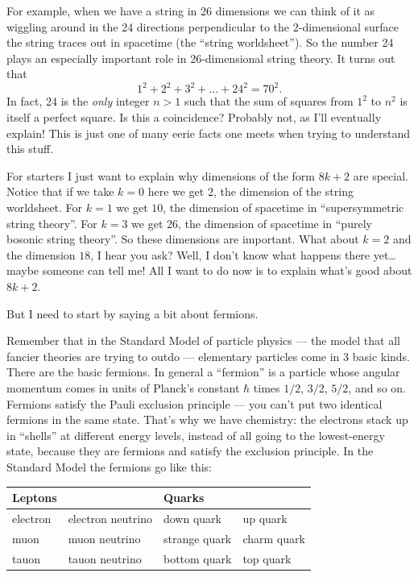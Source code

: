 \documentclass{article}
\begin{document}
For example, when we have a string in 26 dimensions we can think of it
as wiggling around in the 24 directions perpendicular to the
2-dimensional surface the string traces out in spacetime (the ``string
worldsheet''). So the number 24 plays an especially important role in
26-dimensional string theory. It turns out that
\[1^2 + 2^2 + 3^2 + \ldots + 24^2 = 70^2.\] In fact, 24 is the
\emph{only} integer \(n > 1\) such that the sum of squares from \(1^2\)
to \(n^2\) is itself a perfect square. Is this a coincidence? Probably
not, as I'll eventually explain! This is just one of many eerie facts
one meets when trying to understand this stuff.

For starters I just want to explain why dimensions of the form
\(8k + 2\) are special. Notice that if we take \(k = 0\) here we get
\(2\), the dimension of the string worldsheet. For \(k = 1\) we get
\(10\), the dimension of spacetime in ``supersymmetric string theory''.
For \(k = 3\) we get \(26\), the dimension of spacetime in ``purely
bosonic string theory''. So these dimensions are important. What about
\(k = 2\) and the dimension \(18\), I hear you ask? Well, I don't know
what happens there yet\ldots{} maybe someone can tell me! All I want to
do now is to explain what's good about \(8k+2\).

But I need to start by saying a bit about fermions.

Remember that in the Standard Model of particle physics --- the model
that all fancier theories are trying to outdo --- elementary particles
come in 3 basic kinds. There are the basic fermions. In general a
``fermion'' is a particle whose angular momentum comes in units of
Planck's constant \(\hbar\) times \(1/2\), \(3/2\), \(5/2\), and so on.
Fermions satisfy the Pauli exclusion principle --- you can't put two
identical fermions in the same state. That's why we have chemistry: the
electrons stack up in ``shells'' at different energy levels, instead of
all going to the lowest-energy state, because they are fermions and
satisfy the exclusion principle. In the Standard Model the fermions go
like this:

\begin{longtable}[]{@{}llll@{}}
\toprule
\textbf{Leptons} & & \textbf{Quarks} &\tabularnewline
\midrule
\endhead
electron & electron neutrino & down quark & up quark\tabularnewline
muon & muon neutrino & strange quark & charm quark\tabularnewline
tauon & tauon neutrino & bottom quark & top quark\tabularnewline
\bottomrule
\end{longtable}
\end{document}
